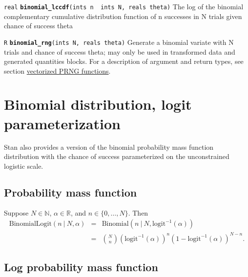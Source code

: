 \documentclass[
  10pt,
]{book}
\begin{document}

\texttt{real} \textbf{\texttt{binomial\_lccdf}}\texttt{(ints\ n\ \textbar{}\ ints\ N,\ reals\ theta)}\newline
The log of the binomial complementary cumulative distribution function
of n successes in N trials given chance of success theta


\texttt{R} \textbf{\texttt{binomial\_rng}}\texttt{(ints\ N,\ reals\ theta)}\newline
Generate a binomial variate with N trials and chance of success theta;
may only be used in transformed data and generated quantities blocks.
For a description of argument and return types, see section
\protect\hyperlink{prng-vectorization}{vectorized PRNG functions}.

\hypertarget{binomial-distribution-logit-parameterization}{%
\section{Binomial distribution, logit parameterization}\label{binomial-distribution-logit-parameterization}}

Stan also provides a version of the binomial probability mass function
distribution with the chance of success parameterized on the
unconstrained logistic scale.

\hypertarget{probability-mass-function-4}{%
\subsection{Probability mass function}\label{probability-mass-function-4}}

Suppose \(N \in \mathbb{N}\), \(\alpha \in \mathbb{R}\), and \(n \in \{0,\ldots,N\}\). Then \begin{eqnarray*}
\text{BinomialLogit}(n~|~N,\alpha) & = &
\text{Binomial}(n~|~N,\text{logit}^{-1}(\alpha)) \\[6pt] & = &
\binom{N}{n} \left( \text{logit}^{-1}(\alpha) \right)^{n}  \left( 1 -
\text{logit}^{-1}(\alpha) \right)^{N - n}.  \end{eqnarray*}

\hypertarget{log-probability-mass-function-1}{%
\subsection{Log probability mass function}\label{log-probability-mass-function-1}}
\end{document}
